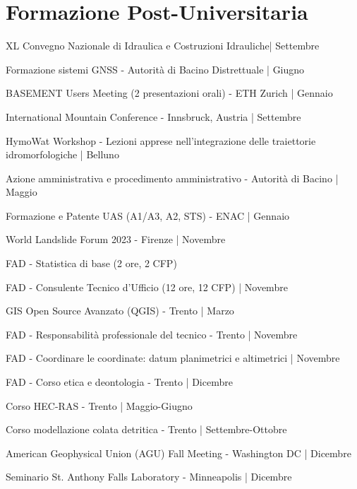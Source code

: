 
\section{Formazione Post-Universitaria}

 XL Convegno Nazionale di Idraulica e Costruzioni Idrauliche| Settembre
\sectionsep

 Formazione sistemi GNSS - Autorità di Bacino Distrettuale | Giugno
\sectionsep

 BASEMENT Users Meeting (2 presentazioni orali) - ETH Zurich | Gennaio
\sectionsep

 International Mountain Conference - Innsbruck, Austria | Settembre
\sectionsep

 HymoWat Workshop - Lezioni apprese nell'integrazione delle traiettorie idromorfologiche | Belluno
\sectionsep

 Azione amministrativa e procedimento amministrativo - Autorità di Bacino | Maggio
\sectionsep

 Formazione e Patente UAS (A1/A3, A2, STS) - ENAC | Gennaio
\sectionsep

 World Landslide Forum 2023 - Firenze | Novembre
\sectionsep

 FAD - Statistica di base (2 ore, 2 CFP)
\sectionsep

 FAD - Consulente Tecnico d'Ufficio (12 ore, 12 CFP) | Novembre
\sectionsep

 GIS Open Source Avanzato (QGIS) - Trento | Marzo
\sectionsep

 FAD - Responsabilità professionale del tecnico - Trento | Novembre
\sectionsep

 FAD - Coordinare le coordinate: datum planimetrici e altimetrici | Novembre
\sectionsep

 FAD - Corso etica e deontologia - Trento | Dicembre
\sectionsep

 Corso HEC-RAS - Trento | Maggio-Giugno
\sectionsep

 Corso modellazione colata detritica - Trento | Settembre-Ottobre
\sectionsep

 American Geophysical Union (AGU) Fall Meeting - Washington DC | Dicembre
\sectionsep

 Seminario St. Anthony Falls Laboratory - Minneapolis | Dicembre
\sectionsep


